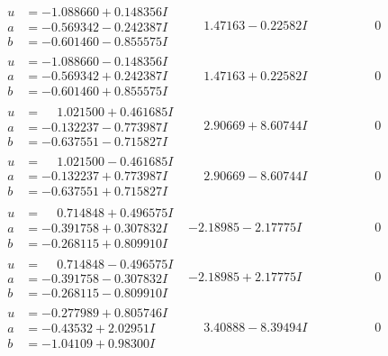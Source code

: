 \documentclass[1p]{elsarticle_modified}
\theoremstyle{definition}
\begin{document}
$$\begin{array}{c|c|c}
\begin{aligned}
u &= -1.088660 + 0.148356 I \\
a &= -0.569342 - 0.242387 I \\
b &= -0.601460 - 0.855575 I\end{aligned}
 & \phantom{-}1.47163 - 0.22582 I & \phantom{-0.000000 } 0 \\ \hline\begin{aligned}
u &= -1.088660 - 0.148356 I \\
a &= -0.569342 + 0.242387 I \\
b &= -0.601460 + 0.855575 I\end{aligned}
 & \phantom{-}1.47163 + 0.22582 I & \phantom{-0.000000 } 0 \\ \hline\begin{aligned}
u &= \phantom{-}1.021500 + 0.461685 I \\
a &= -0.132237 - 0.773987 I \\
b &= -0.637551 - 0.715827 I\end{aligned}
 & \phantom{-}2.90669 + 8.60744 I & \phantom{-0.000000 } 0 \\ \hline\begin{aligned}
u &= \phantom{-}1.021500 - 0.461685 I \\
a &= -0.132237 + 0.773987 I \\
b &= -0.637551 + 0.715827 I\end{aligned}
 & \phantom{-}2.90669 - 8.60744 I & \phantom{-0.000000 } 0 \\ \hline\begin{aligned}
u &= \phantom{-}0.714848 + 0.496575 I \\
a &= -0.391758 + 0.307832 I \\
b &= -0.268115 + 0.809910 I\end{aligned}
 & -2.18985 - 2.17775 I & \phantom{-0.000000 } 0 \\ \hline\begin{aligned}
u &= \phantom{-}0.714848 - 0.496575 I \\
a &= -0.391758 - 0.307832 I \\
b &= -0.268115 - 0.809910 I\end{aligned}
 & -2.18985 + 2.17775 I & \phantom{-0.000000 } 0 \\ \hline\begin{aligned}
u &= -0.277989 + 0.805746 I \\
a &= -0.43532 + 2.02951 I \\
b &= -1.04109 + 0.98300 I\end{aligned}
 & \phantom{-}3.40888 - 8.39494 I & \phantom{-0.000000 } 0 \\ \hline\begin{aligned}

\end{aligned}
\end{array}$$
\end{document}

